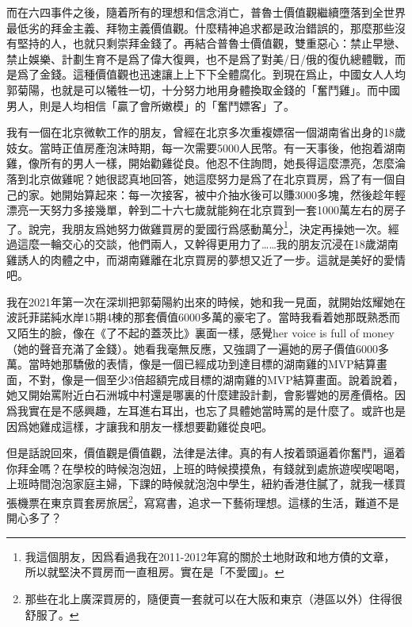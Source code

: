 而在六四事件之後，隨着所有的理想和信念消亡，普魯士價值觀繼續墮落到全世界最低劣的拜金主義、拜物主義價值觀。什麼精神追求都是政治錯誤的，那麼那些沒有堅持的人，也就只剩崇拜金錢了。再結合普魯士價值觀，雙重惡心：禁止早戀、禁止娛樂、計劃生育不是爲了偉大復興，也不是爲了對美/日/俄的復仇總體戰，而是爲了金錢。這種價值觀也迅速讓上上下下全體腐化。到現在爲止，中國女人人均郭菊陽，也就是可以犧牲一切，十分努力地用身體換取金錢的「奮鬥雞」。而中國男人，則是人均相信「贏了會所嫩模」的「奮鬥嫖客」了。

我有一個在北京微軟工作的朋友，曾經在北京多次重複嫖宿一個湖南省出身的18歲妓女。當時正值房產泡沫時期，每一次需要5000人民幣。有一天事後，他抱着湖南雞，像所有的男人一樣，開始勸雞從良。他忍不住詢問，她長得這麼漂亮，怎麼淪落到北京做雞呢？她很認真地回答，她這麼努力是爲了在北京買房，爲了有一個自己的家。她開始算起來：每一次接客，被中介抽水後可以賺3000多塊，然後趁年輕漂亮一天努力多接幾單，幹到二十六七歲就能夠在北京買到一套1000萬左右的房子了。說完，我朋友爲她努力做雞買房的愛國行爲感動萬分\footnote{我這個朋友，因爲看過我在2011-2012年寫的關於土地財政和地方債的文章，所以就堅決不買房而一直租房。實在是「不愛國」。}，決定再操她一次。經過這麼一輪交心的交談，他們兩人，又幹得更用力了……我的朋友沉浸在18歲湖南雞誘人的肉體之中，而湖南雞離在北京買房的夢想又近了一步。這就是美好的愛情吧。

我在2021年第一次在深圳把郭菊陽約出來的時候，她和我一見面，就開始炫耀她在波託菲諾純水岸15期4棟的那套價值6000多萬的豪宅了。當時我看着她那既熟悉而又陌生的臉，像在《了不起的蓋茨比》裏面一樣，感覺her voice is full of money（她的聲音充滿了金錢）。她看我毫無反應，又強調了一遍她的房子價值6000多萬。當時她那驕傲的表情，像是一個已經成功到達目標的湖南雞的MVP結算畫面，不對，像是一個至少3倍超額完成目標的湖南雞的MVP結算畫面。說着說着，她又開始罵附近白石洲城中村還是哪裏的什麼建設計劃，會影響她的房產價格。因爲我實在是不感興趣，左耳進右耳出，也忘了具體她當時罵的是什麼了。或許也是因爲她雞成這樣，才讓我和朋友一樣想要勸雞從良吧。

但是話說回來，價值觀是價值觀，法律是法律。真的有人按着頭逼着你奮鬥，逼着你拜金嗎？在學校的時候泡泡妞，上班的時候摸摸魚，有錢就到處旅遊喫喫喝喝，上班時間泡泡家庭主婦，下課的時候就泡泡中學生，紐約香港住膩了，就我一樣買張機票在東京買套房旅居\footnote{那些在北上廣深買房的，隨便賣一套就可以在大阪和東京（港區以外）住得很舒服了。}，寫寫書，追求一下藝術理想。這樣的生活，難道不是開心多了？
